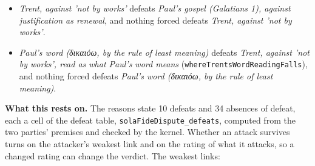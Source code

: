 \documentclass[11pt]{article}
\begin{document}
\begin{itemize}
\begin{itemize}
\item \emph{Trent, against 'not by works'} defeats \emph{Paul's gospel (Galatians 1), against justification as renewal}, and nothing forced defeats \emph{Trent, against 'not by works'}.
\item \emph{Paul's word (δικαιόω, by the rule of least meaning)} defeats \emph{Trent, against 'not by works', read as what Paul's word means} (\texttt{where\allowbreak{}Trents\allowbreak{}Word\allowbreak{}Reading\allowbreak{}Falls}), and nothing forced defeats \emph{Paul's word (δικαιόω, by the rule of least meaning)}.
\end{itemize}
\end{itemize}
\par\noindent\textbf{What this rests on.} The reasons state 10 defeats and 34 absences of defeat, each a cell of the defeat table, \texttt{sola\allowbreak{}Fide\allowbreak{}Dispute\_\allowbreak{}defeats}, computed from the two parties' premises and checked by the kernel. Whether an attack survives turns on the attacker's weakest link and on the rating of what it attacks, so a changed rating can change the verdict. The weakest links:
\end{document}
